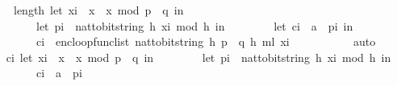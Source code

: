 \begin{isabellebody}
\ \ \ \ length\ {\isacharparenleft}{\kern0pt}{\isacharparenleft}{\kern0pt}let\ x{\isacharunderscore}{\kern0pt}i\ {\isacharequal}{\kern0pt}\ x{\isacharunderscore}{\kern0pt}{}\ {\isacharasterisk}{\kern0pt}\ x{\isacharunderscore}{\kern0pt}{}\ mod\ {\isacharparenleft}{\kern0pt}p\ {\isacharasterisk}{\kern0pt}\ q{\isacharparenright}{\kern0pt}\ in\isanewline
\ \ \ \ \ \ \ \ let\ p{\isacharunderscore}{\kern0pt}i\ {\isacharequal}{\kern0pt}\ nat{\isacharunderscore}{\kern0pt}to{\isacharunderscore}{\kern0pt}bitstring\ h\ {\isacharparenleft}{\kern0pt}x{\isacharunderscore}{\kern0pt}i\ mod\ {}{\isacharcircum}{\kern0pt}h{\isacharparenright}{\kern0pt}\ in\isanewline
\ \ \ \ \ \ \ \ let\ c{\isacharunderscore}{\kern0pt}i\ {\isacharequal}{\kern0pt}\ a\ {\isacharbrackleft}{\kern0pt}{\isasymoplus}{\isacharbrackright}{\kern0pt}\ p{\isacharunderscore}{\kern0pt}i\ in\isanewline
\ \ \ \ \ \ \ \ c{\isacharunderscore}{\kern0pt}i\ {\isacharhash}{\kern0pt}\ enc{\isacharunderscore}{\kern0pt}loop{\isacharunderscore}{\kern0pt}func{\isacharunderscore}{\kern0pt}list\ {\isacharparenleft}{\kern0pt}nat{\isacharunderscore}{\kern0pt}to{\isacharunderscore}{\kern0pt}bitstring\ h{\isacharcomma}{\kern0pt}\ p\ {\isacharasterisk}{\kern0pt}\ q{\isacharcomma}{\kern0pt}\ h{\isacharcomma}{\kern0pt}\ m{\isacharunderscore}{\kern0pt}l{\isacharparenright}{\kern0pt}\ x{\isacharunderscore}{\kern0pt}i\isanewline
\ \ \ \ \ \ \ \ {\isacharparenright}{\kern0pt}{\isacharparenright}{\kern0pt}{\isachardoublequoteclose}\ \isamarkupfalse%
\ auto\isanewline
\ \ \isamarkupfalse%
\ \isamarkupfalse%
\ {\isachardoublequoteopen}{\isasymexists}c{\isacharunderscore}{\kern0pt}i{\isacharprime}{\kern0pt}{\isachardot}{\kern0pt}\ let\ x{\isacharunderscore}{\kern0pt}i\ {\isacharequal}{\kern0pt}\ x{\isacharunderscore}{\kern0pt}{}\ {\isacharasterisk}{\kern0pt}\ x{\isacharunderscore}{\kern0pt}{}\ mod\ {\isacharparenleft}{\kern0pt}p\ {\isacharasterisk}{\kern0pt}\ q{\isacharparenright}{\kern0pt}\ in\isanewline
\ \ \ \ \ \ \ \ let\ p{\isacharunderscore}{\kern0pt}i\ {\isacharequal}{\kern0pt}\ nat{\isacharunderscore}{\kern0pt}to{\isacharunderscore}{\kern0pt}bitstring\ h\ {\isacharparenleft}{\kern0pt}x{\isacharunderscore}{\kern0pt}i\ mod\ {}{\isacharcircum}{\kern0pt}h{\isacharparenright}{\kern0pt}\ in\isanewline
\ \ \ \ \ \ \ \ c{\isacharunderscore}{\kern0pt}i{\isacharprime}{\kern0pt}\ {\isacharequal}{\kern0pt}\ a\ {\isacharbrackleft}{\kern0pt}{\isasymoplus}{\isacharbrackright}{\kern0pt}\ p{\isacharunderscore}{\kern0pt}i{\isachardoublequoteclose}\ \isamarkupfalse%

\end{isabellebody}

